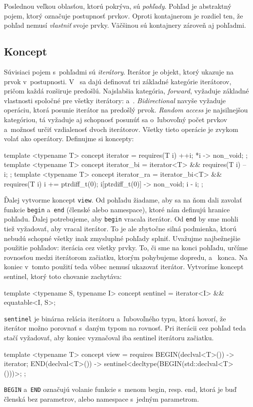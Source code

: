 Poslednou veľkou oblasťou, ktorú \PP{} pokrýva, sú \emph{pohľady}. Pohľad je ab\-strakt\-ný pojem, ktorý označuje postupnosť prvkov. Oproti kontajnerom je rozdiel ten, že pohľad nemusí \emph{vlastniť} svoje prvky. Väčšinou sú kontajnery zároveň aj pohľadmi.

\subsection{Koncept}

Súvisiaci pojem s~pohľadmi sú \emph{iterátory}. Iterátor je objekt, ktorý ukazuje na prvok v~postupnosti. V~\Cpp{} sa dajú definovať tri základné kategórie iterátorov, pričom každá rozširuje predošlú. Najslabšia kategória, \emph{forward}, vyžaduje základné vlastnosti spoločné pre všetky iterátory:  a~. \emph{Bidirectional} navyše vyžaduje operáciu, ktorá posunie iterátor na predošlý prvok. \emph{Random access} je najsilnejšou kategóriou, tá vyžaduje aj schopnosť posunúť sa o~ľubovoľný počet prvkov a~možnosť určiť vzdialenosť dvoch iterátorov. Všetky tieto operácie je zvykom volať ako operátory. Definujme si koncepty:
\begin{code}[fontsize=\footnotesize]
template <typename T> concept iterator = requires(T i)
{   ++i;
   { *i } -> non_void;
};
template <typename T> concept iterator_bi = iterator<T> && requires(T i)
{   --i;
};
template <typename T> concept iterator_ra = iterator_bi<T> && requires(T i)
{   i += ptrdiff_t(0);
    { i[ptrdiff_t(0)] } -> non_void;
    i - i;
};
\end{code}

Ďalej vytvorme koncept \texttt{view}. Od pohľadu žiadame, aby sa na ňom dali zavolať funkcie \texttt{begin} a~\texttt{end} (členské alebo namespace), ktoré nám definujú hranice pohľadu. Ďalej potrebujeme, aby \texttt{begin} vracala iterátor. Od \texttt{end} by sme mohli tiež vyžadovať, aby vracal iterátor. To je ale zbytočne silná podmienka, ktorú nebudú schopné všetky inak zmysluplné pohľady splniť. Uvažujme najbežnejšie použitie pohľadov: iterácia cez všetky prvky. To, či sme na konci pohľadu, určíme rovnosťou medzi iterátorom začiatku, ktorým pohybujeme dopredu, a~ konca. Na koniec v~tomto použití teda vôbec nemusí ukazovať iterátor. Vytvoríme koncept sentinel, ktorý toto chovanie zachytáva:
\begin{code}
template <typename S, typename I>
concept sentinel = iterator<I> && equatable<I, S>;
\end{code}
\texttt{sentinel} je binárna relácia iterátoru a~ľubovoľného typu, ktorá hovorí, že iterátor možno porovnať s~daným typom na rovnosť. Pri iterácii cez pohľad teda stačí vyžadovať, aby koniec vyznačoval iba sentinel iterátoru začiatku.
\begin{code}[fontsize=\footnotesize]
template <typename T> concept view = requires
{   { BEGIN(declval<T>()) } -> iterator;
    { END(declval<T>()) } -> sentinel<decltype(BEGIN(std::declval<T>()))>;
};
\end{code}
\texttt{BEGIN} a~\texttt{END} označujú volanie funkcie s~menom begin, resp. end, ktorá je buď členská bez parametrov, alebo namespace s~jedným parametrom.

